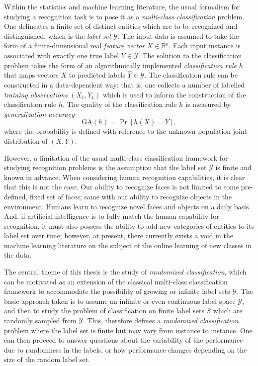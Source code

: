 \documentclass[12pt]{article}
\begin{document}
Within the statistics and machine learning literature, the usual
formalism for studying a recognition task is to pose it as a
\emph{multi-class classification} problem.  One delineates a finite
set of distinct entities which are to be recognized and distinguished,
which is the \emph{label set} $\mathcal{Y}$.  The input data is
assumed to take the form of a finite-dimensional real \emph{feature
  vector} $X \in \mathbb{R}^p$.  Each input instance is associated
with exactly one true label $Y \in \mathcal{Y}$.  The solution to the
classification problem takes the form of an algorithmically
implemented \emph{classification rule} $h$ that maps vectors $X$ to
predicted labels $\hat{Y} \in \mathcal{Y}$.  The classification rule
can be constructed in a data-dependent way: that is, one collects a
number of labelled \emph{training observations} $(X_1, Y_1)$ which is
used to inform the construction of the classification rule $h$.  The
quality of the classification rule $h$ is measured by \emph{generalization accuracy}
\[
\text{GA}(h) = \Pr[h(X) = Y],
\]
where the probability is defined with reference to the unknown
population joint distribution of $(X, Y)$.  

However, a limitation of the usual multi-class classification
framework for studying recognition problems is the assumption that the
label set $\mathcal{Y}$ is finite and known in advance.  When
considering human recognition capabilities, it is clear that this is
not the case.  Our ability to recognize faces is not limited to some
pre-defined, fixed set of faces; same with our ability to recognize
objects in the environment.  Humans learn to recognize novel faces and
objects on a daily basis.  And, if artificial intelligence is to fully
match the human capability for recognition, it must also possess the
ability to add new categories of entities to its label set over time;
however, at present, there currently exists a void in the machine
learning literature on the subject of the online learning of new
classes in the data.

The central theme of this thesis is the study of \emph{randomized
  classification}, which can be motivated as an extension of the
classical multi-class classification framework to accommodate the
possibility of growing or infinite label sets $\mathcal{Y}$. The basic
approach taken is to assume an infinite or even continuous label space
$\mathcal{Y}$, and then to study the problem of classification on
finite label sets $S$ which are randomly sampled from $\mathcal{Y}.$
This, therefore defines a \emph{randomized classification} problem
where the label set is finite but may vary from instance to instance.
One can then proceed to answer questions about the variability of the
performance due to randomness in the labels, or how performance
changes depending on the size of the random label set.
\end{document}
